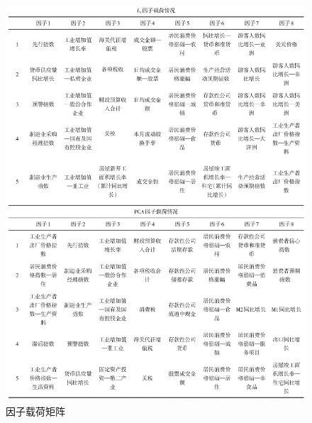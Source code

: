 \begin{figure}[H]
    \centering
    \includegraphics[width=.9\textwidth]{pics/factors.jpg}
    \caption{\small 因子载荷矩阵}
    \label{diff-factors}
\end{figure}

